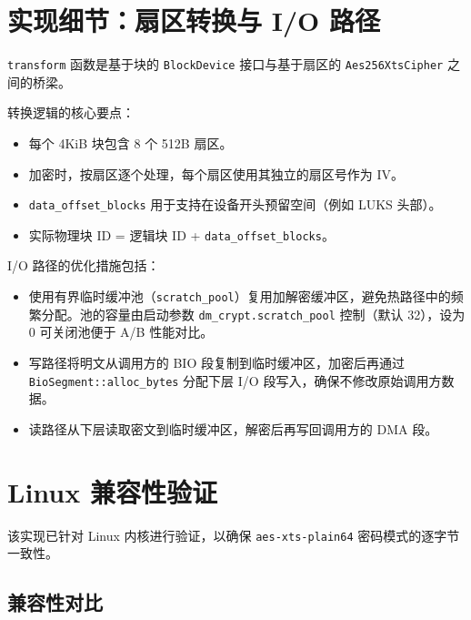 \section{实现细节：扇区转换与 I/O 路径}

\texttt{transform} 函数是基于块的 \texttt{BlockDevice} 接口与基于扇区的 \texttt{Aes256\allowbreak XtsCipher} 之间的桥梁。

转换逻辑的核心要点：
\begin{itemize}
    \item 每个 4KiB 块包含 8 个 512B 扇区。
    \item 加密时，按扇区逐个处理，每个扇区使用其独立的扇区号作为 IV。
    \item \texttt{data\_offset\_blocks} 用于支持在设备开头预留空间（例如 LUKS 头部）。
    \item 实际物理块 ID = 逻辑块 ID + \texttt{data\_offset\_blocks}。
\end{itemize}

I/O 路径的优化措施包括：
\begin{itemize}
    \item 使用有界临时缓冲池（\texttt{scratch\_pool}）复用加解密缓冲区，避免热路径中的频繁分配。池的容量由启动参数 \texttt{dm\_crypt.scratch\_pool} 控制（默认 32），设为 0 可关闭池便于 A/B 性能对比。
    \item 写路径将明文从调用方的 BIO 段复制到临时缓冲区，加密后再通过 \texttt{BioSegment::\allowbreak alloc\_bytes} 分配下层 I/O 段写入，确保不修改原始调用方数据。
    \item 读路径从下层读取密文到临时缓冲区，解密后再写回调用方的 DMA 段。
\end{itemize}

\section{Linux 兼容性验证}

该实现已针对 Linux 内核进行验证，以确保 \texttt{aes-xts-plain64} 密码模式的逐字节一致性。

\subsection{兼容性对比}

